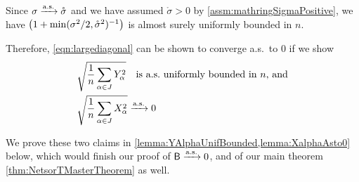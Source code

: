 \documentclass[main.tex]{subfiles}
\begin{document}
Since $\sigma \xrightarrow{\mathrm{a.s.}} \mathring \sigma$ and we have assumed $\mathring \sigma > 0$ by \cref{assm:mathringSigmaPositive}, we have $\left( 1 + \min(\sigma^2/2, \mathring \sigma^2)^{-1} \right)$ is almost surely uniformly bounded in $n$.

Therefore, \cref{eqn:largediagonal} can be shown to converge a.s.\ to 0 if we show
\begin{align*}
&\sqrt{\f 1 n \sum_{\alpha \in \JJc} Y_\alpha^2} \quad\text{is a.s.\ uniformly bounded in $n$, and}\\
&\sqrt{\f 1 n \sum_{\alpha \in \JJc} X_\alpha^2} \asto 0
\end{align*}

We prove these two claims in \cref{lemma:YAlphaUnifBounded,lemma:XalphaAsto0} below, which would finish our proof of $\mathsf{B} \xrightarrow{\mathrm{a.s.}} 0$, and of our main theorem \cref{thm:NetsorTMasterTheorem} as well.
\end{document}
